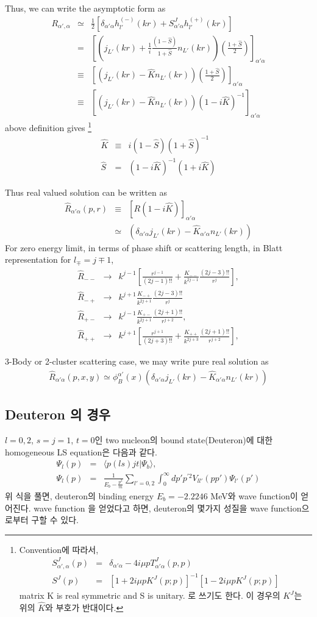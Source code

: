 \documentclass[10pt]{article}
\newcommand{\bea}{\begin{eqnarray}}
\newcommand{\eea}{\end{eqnarray}}
\newcommand{\no}{\nonumber \\}
\def\la{\langle}
\def\ra{\rangle}
\begin{document}
Thus, we can write the asymptotic form as
\bea
R_{\alpha',\alpha}&\simeq&
      \frac{1}{2}[\delta_{\alpha'\alpha}h^{(-)}_{l'}(kr)
                  +S^J_{\alpha'\alpha}h^{(+)}_{l'}(kr)]\no
          &=&
          \left[
          (j_{L'}(kr)+\frac{1}{i}\frac{(1-\hat{S})}{1+\hat{S}}n_{L'}(kr))             
          \left(\frac{1+\hat{S}}{2}\right)\right]_{\alpha'\alpha}\no
          &\equiv&
          \left[
          (j_{L'}(kr)-\hat{K}n_{L'}(kr))             
          \left(\frac{1+\hat{S}}{2}\right)\right]_{\alpha'\alpha}\no
          &\equiv&
          \left[
          (j_{L'}(kr)-\hat{K}n_{L'}(kr))             
          (1-i\hat{K})^{-1}\right]_{\alpha'\alpha}
\eea
above definition gives
\footnote{
Convention에 따라서,
\bea
S^{J}_{\alpha',\alpha}(p)
&=&\delta_{\alpha'\alpha}-4i\mu p T^J_{\alpha'\alpha}(p,p)\no
S^J(p)&=&[1+2i \mu p K^J(p;p)]^{-1}[1-2i\mu p K^J(p;p)]
\eea
matrix K is real symmetric and S is unitary.
로 쓰기도 한다.
이 경우의 $K^J$는 위의 $\hat{K}$와 부호가 반대이다.
}
\bea
\hat{K}&\equiv& i(1-\hat{S})(1+\hat{S})^{-1}\no
\hat{S}&=&(1-i\hat{K})^{-1}(1+i\hat{K})
\eea

Thus real valued solution can be written as
\bea
\hat{R}_{\alpha'\alpha}(p,r)&\equiv&
 \left[R(1-i\hat{K})\right]_{\alpha'\alpha}\no
 &\simeq& 
 \left(\delta_{\alpha'\alpha}j_{L'}(kr)-\hat{K}_{\alpha'\alpha}n_{L'}(kr)\right)
\eea
For zero energy limit, in terms of phase shift or scattering length,
in Blatt representation for $l_{\mp}=j\mp 1$,
\bea
\hat{R}_{--}&\to& k^{j-1}[\frac{r^{j-1}}{(2j-1)!!}
                         +\frac{K_{--}}{k^{2j-1}}
                         \frac{(2j-3)!!}{r^{j}} ],\no
\hat{R}_{-+}&\to& k^{j+1}\frac{K_{-+}}{k^{2j+1}}
                  \frac{(2j-3)!!}{r^j}\no
\hat{R}_{+-}&\to& k^{j-1}\frac{K_{+-}}{k^{2j+1}}
                  \frac{(2j+1)!!}{r^{j+2}},\no
\hat{R}_{++}&\to& k^{j+1}[\frac{r^{j+1}}{(2j+3)!!}
                         +\frac{K_{++}}{k^{2j+3}}
                         \frac{(2j+1)!!}{r^{j+2}} ],
\eea


3-Body or 2-cluster scattering case,
we may write pure real solution as 
\bea
\hat{R}_{\alpha'\alpha}(p,x,y)\simeq
\phi^{\alpha'}_B(x)\left(\delta_{\alpha'\alpha}j_{L'}(kr)-\hat{K}_{\alpha'\alpha}n_{L'}(kr)\right)
\eea

\subsection{Deuteron 의 경우}
$l=0,2$, $s=j=1$, $t=0$인 two nucleon의 bound state(Deuteron)에 대한 
homogeneous LS equation은 다음과 같다.
\bea
\Psi_l(p)&=&\la p(ls) j t|\Psi_b\ra,\no
\Psi_l(p)&=&\frac{1}{E_b-\frac{p^2}{m}}\sum_{l'=0,2}\int_0^\infty dp' p^{'2} V_{ll'}(pp')\Psi_{l'}(p')
\eea
위 식을 풀면, deuteron의 binding energy $E_b=-2.2246$ MeV와 wave function이 얻어진다.
wave function 을 얻었다고 하면, deuteron의 몇가지 성질을 wave function으로부터 구할 수 있다.
\end{document}
